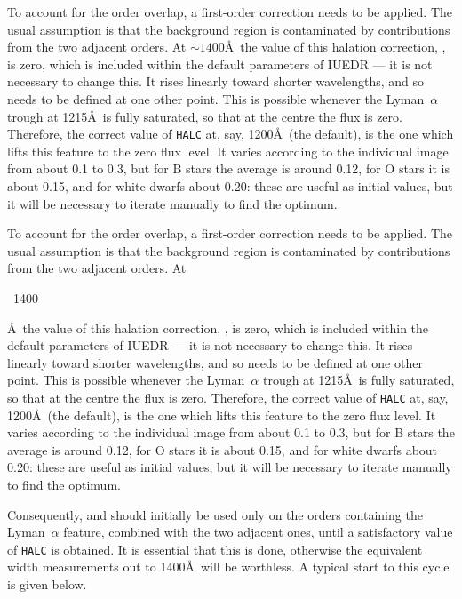 \begin{latexonly}
To account for the order overlap, a first-order correction needs to be applied.
The usual assumption is that the background region is contaminated by
contributions from the two adjacent orders. At $\sim 1400$\AA\ the value of
this halation correction, , is zero, which is
included within the
default parameters of IUEDR --- it is not necessary to change this.
It rises linearly toward shorter wavelengths, and so needs to be defined at
one other point.  This is possible whenever the Lyman~$\alpha$ trough at
1215\AA\ is fully saturated, so that at the centre the flux is zero.
Therefore, the correct value of \verb+HALC+ at, say, 1200\AA\ (the default),
is the one which lifts this feature to the zero flux level. It varies
according to the individual image from about 0.1 to 0.3, but for B stars the
average is around 0.12, for O stars it is about 0.15, and for white dwarfs
about 0.20: these are useful as initial values, but it will be necessary to
iterate manually to find the optimum.
\end{latexonly}

\begin{htmlonly}
To account for the order overlap, a first-order correction needs to be applied.
The usual assumption is that the background region is contaminated by
contributions from the two adjacent orders. At
\begin{rawhtml}~1400\end{rawhtml}\AA\ the value of this halation correction,
,
is zero, which is included within the default parameters of IUEDR
--- it is not necessary to change this. It rises linearly toward shorter
wavelengths, and so needs to be defined at one other point.  This is possible
whenever the Lyman~$\alpha$ trough at 1215\AA\ is fully saturated, so that at
the centre the flux is zero. Therefore, the correct value of \verb+HALC+ at,
say, 1200\AA\ (the default), is the one which lifts this feature to the zero
flux level. It varies according to the individual image from about 0.1 to 0.3,
but for B stars the average is around 0.12, for O stars it is about 0.15, and
for white dwarfs about 0.20: these are useful as initial values, but it will be
necessary to iterate manually to find the optimum.
\end{htmlonly}

Consequently,  and 
should initially be used only on
the orders containing the Lyman~$\alpha$ feature, combined with the two
adjacent ones, until a satisfactory value of \verb+HALC+ is obtained.  It is
essential that this is done, otherwise the equivalent width measurements out
to 1400\AA\ will be worthless.  A typical start to this cycle is given below.

